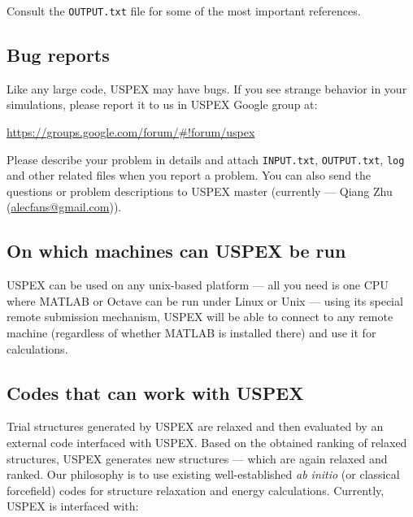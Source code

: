\documentclass[12pt]{article}
\newcommand{\file}[1]{\texttt{#1}}
\begin{document}
Consult the \file{OUTPUT.txt} file for some of the most important references.

\subsection{Bug reports}

Like any large code, USPEX may have bugs. If you see strange behavior in your
simulations, please report it to us in USPEX Google group at:

\begin{center}
\textcolor{blue}{\url{https://groups.google.com/forum/#!forum/uspex}}
\end{center}

Please describe your problem in details and attach \file{INPUT.txt},
\file{OUTPUT.txt}, \file{log} and other related files when you report a problem.
You can also send the questions or problem descriptions to USPEX master
(currently --- Qiang Zhu
(\href{mailto:alecfans@gmail.com}{alecfans@gmail.com})).

\subsection{On which machines can USPEX be run}
USPEX can be used on any unix-based platform --- all you need is one CPU where
MATLAB or Octave can be run under Linux or Unix --- using its special remote
submission mechanism, USPEX will be able to connect to any remote machine
(regardless of whether MATLAB is installed there) and use it for calculations.

\subsection{Codes that can work with USPEX} \label{abinitio_codes}

Trial structures generated by USPEX are relaxed and then evaluated by an
external code interfaced with USPEX. Based on the obtained ranking of relaxed
structures, USPEX generates new structures --- which are again relaxed and
ranked. Our philosophy is to use existing well-established \emph{ab initio} (or
classical forcefield) codes for structure relaxation and energy calculations.
Currently, USPEX is interfaced with:
\end{document}

